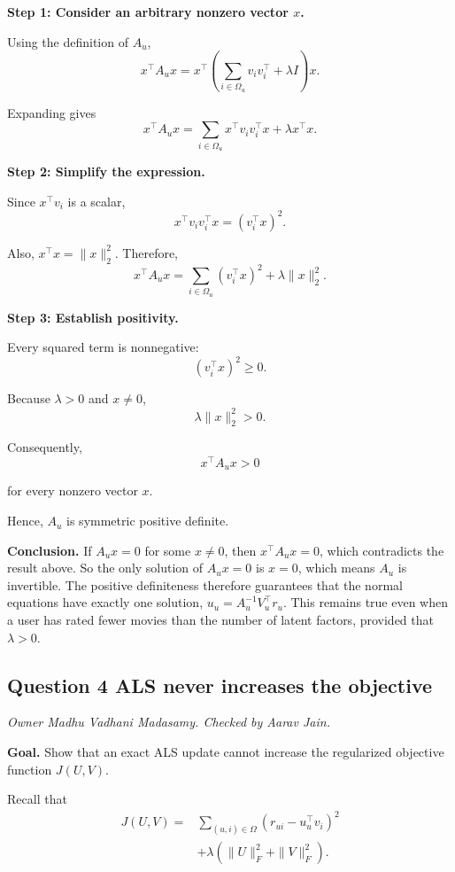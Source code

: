 \textbf{Step 1: Consider an arbitrary nonzero vector $x$.}

Using the definition of $A_u$,
\[
x^\top A_ux
=
x^\top
\left(
\sum_{i\in\Omega_u}v_iv_i^\top
+\lambda I
\right)x.
\]

Expanding gives
\[
x^\top A_ux
=
\sum_{i\in\Omega_u}
x^\top v_iv_i^\top x
+\lambda x^\top x.
\]

\textbf{Step 2: Simplify the expression.}

Since $x^\top v_i$ is a scalar,
\[
x^\top v_iv_i^\top x
=
(v_i^\top x)^2.
\]

Also, $x^\top x=\|x\|_2^2$. Therefore,
\[
x^\top A_ux
=
\sum_{i\in\Omega_u}(v_i^\top x)^2
+\lambda\|x\|_2^2.
\]

\textbf{Step 3: Establish positivity.}

Every squared term is nonnegative:
\[
(v_i^\top x)^2\geq 0.
\]

Because $\lambda>0$ and $x\neq 0$,
\[
\lambda\|x\|_2^2>0.
\]

Consequently,
\[
\boxed{x^\top A_ux>0}
\]

for every nonzero vector $x$.

Hence, $A_u$ is symmetric positive definite.

\textbf{Conclusion.} If $A_ux=0$ for some $x\neq0$, then
$x^\top A_ux=0$, which contradicts the result above. So the only
solution of $A_ux=0$ is $x=0$, which means $A_u$ is invertible.
The positive definiteness therefore guarantees that the normal
equations have exactly one solution, $u_u=A_u^{-1}V_u^\top r_u$. This
remains true even when a user has rated fewer movies than
the number of latent factors, provided that $\lambda>0$.

\subsection*{Question 4 ALS never increases the objective}
\textit{Owner Madhu Vadhani Madasamy. Checked by Aarav Jain.}

\textbf{Goal.} Show that an exact ALS update cannot increase
the regularized objective function $J(U,V)$.

Recall that
\[
\begin{aligned}
J(U,V)={}&
\sum_{(u,i)\in\Omega}
(r_{ui}-u_u^\top v_i)^2\\
&+\lambda(\|U\|_F^2+\|V\|_F^2).
\end{aligned}
\]

